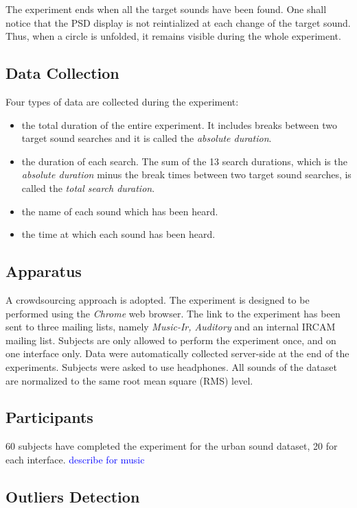 \documentclass{aes2e}
\newcommand{\ml}[2][]{\textcolor{blue}{#1 #2}}
\begin{document}
The experiment ends when all the target sounds have been found. One shall notice that the PSD display is not reintialized at each change of the target sound. Thus, when a circle is unfolded, it remains visible during the whole experiment.

\subsection{Data Collection}
Four types of data are collected during the experiment:
\begin{itemize}
\item the total duration of the entire experiment. It includes breaks between two target sound searches and it is called the \textit{absolute duration}.
\item the duration of each search. The sum of the 13 search durations, which is the \textit{absolute duration} minus the break times between two target sound searches, is called the \textit{total search duration}.
\item the name of each sound which has been heard.
\item the time at which each sound has been heard.  
\end{itemize}

\subsection{Apparatus}

A crowdsourcing approach is adopted. The experiment is designed to be performed using the \textit{Chrome} web browser. The link to the experiment has been sent to three  mailing lists, namely \textit{Music-Ir, Auditory} and an internal IRCAM mailing list. Subjects are only allowed to perform the experiment once, and on one interface only. Data were automatically collected server-side at the end of the experiments. Subjects were asked to use headphones. All sounds of the dataset are normalized to the same root mean square (RMS) level.

\subsection{Participants}

60 subjects have completed the experiment for the urban sound dataset, 20 for each interface. \ml{describe for music}

\subsection{Outliers Detection}
\end{document}
